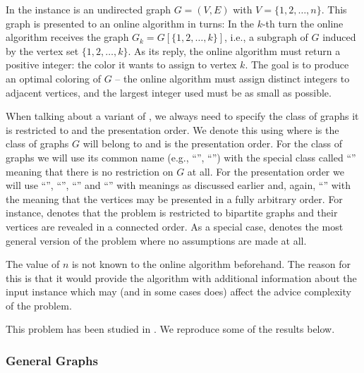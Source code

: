 \begin{definition}\label{def:graph-coloring}
    In  the instance is an undirected graph $G =
    (V, E)$ with $V = \{1, 2, \dots, n\}$. This graph is presented to an
    online algorithm in turns: In the $k$-th turn the online algorithm
    receives the graph $G_k = G[\{1, 2, \dots, k\}]$, i.e., a subgraph of
    $G$ induced by the vertex set $\{1, 2, \dots, k\}$.  As its reply, the
    online algorithm must return a positive integer: the color it wants to
    assign to vertex $k$. The goal is to produce an optimal coloring of
    $G$ -- the online algorithm must assign distinct integers to adjacent
    vertices, and the largest integer used must be as small as possible.
\end{definition}

When talking about a variant of , we always need
to specify the class of graphs it is restricted to and the presentation
order. We denote this using  where  is the class
of graphs $G$ will belong to and  is the presentation order.
For the class of graphs we will use its common name (e.g.,
``'', ``'') with the special class
called ``'' meaning that there is no restriction on $G$ at
all. For the presentation order we will use ``'',
``'', ``'' and ``'' with
meanings as discussed earlier and, again, ``'' with the
meaning that the vertices may be presented in a fully arbitrary order.
For instance,  denotes that the problem is
restricted to bipartite graphs and their vertices are revealed in a
connected order. As a special case,  denotes the most
general version of the problem where no assumptions are made at all.

The value of $n$ is not known to the online algorithm beforehand. The
reason for this is that it would provide the algorithm with additional
information about the input instance which may (and in some cases does)
affect the advice complexity of the problem.

This problem has been studied in \cite{misof-trivial-graphs, hermi}. We
reproduce some of the results below.

\subsubsection{General Graphs}

